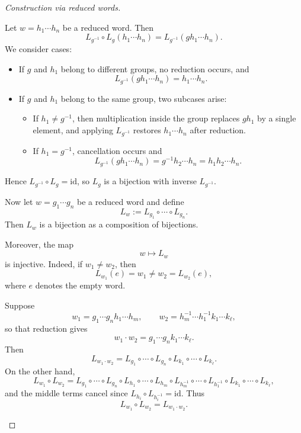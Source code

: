\documentclass[11pt,a4paper]{article}
\theoremstyle{definition}
\theoremstyle{plain}
\theoremstyle{remark}
\newcommand{\1}{\mathbbm{1}}
\begin{document}
\begin{proof}[Construction via reduced words]
\begin{itemize}
    Let $w = h_1 \cdots h_n$ be a reduced word. Then
    \[
    L_{g^{-1}} \circ L_g (h_1 \cdots h_n)
    = L_{g^{-1}}(g h_1 \cdots h_n).
    \]
    We consider cases:

    \begin{itemize}
    \item If $g$ and $h_1$ belong to different groups, no reduction occurs,
    and
    \[
    L_{g^{-1}}(g h_1 \cdots h_n)
    = h_1 \cdots h_n.
    \]

    \item If $g$ and $h_1$ belong to the same group, two subcases arise:
    \begin{itemize}
    \item If $h_1 \neq g^{-1}$, then multiplication inside the group replaces
    $g h_1$ by a single element, and applying $L_{g^{-1}}$ restores
    $h_1 \cdots h_n$ after reduction.

    \item If $h_1 = g^{-1}$, cancellation occurs and
    \[
    L_{g^{-1}}(g h_1 \cdots h_n)
    = g^{-1} h_2 \cdots h_n
    = h_1 h_2 \cdots h_n.
    \]
    \end{itemize}
    \end{itemize}

    Hence $L_{g^{-1}} \circ L_g = \mathrm{id}$, so $L_g$ is a bijection
    with inverse $L_{g^{-1}}$.

    Now let $w = g_1 \cdots g_n$ be a reduced word and define
    \[
    L_w := L_{g_1} \circ \cdots \circ L_{g_n}.
    \]
    Then $L_w$ is a bijection as a composition of bijections.

    Moreover, the map
    \[
    w \longmapsto L_w
    \]
    is injective. Indeed, if $w_1 \neq w_2$, then
    \[
    L_{w_1}(e) = w_1 \neq w_2 = L_{w_2}(e),
    \]
    where $e$ denotes the empty word.

    Suppose
    \[
    w_1 = g_1 \cdots g_n h_1 \cdots h_m,
    \qquad
    w_2 = h_m^{-1} \cdots h_1^{-1} k_1 \cdots k_\ell,
    \]
    so that reduction gives
    \[
    w_1 \cdot w_2 = g_1 \cdots g_n k_1 \cdots k_\ell.
    \]
    Then
    \[
    L_{w_1 \cdot w_2}
    = L_{g_1} \circ \cdots \circ L_{g_n}
    \circ L_{k_1} \circ \cdots \circ L_{k_\ell}.
    \]
    On the other hand,
    \[
    L_{w_1} \circ L_{w_2}
    = L_{g_1} \circ \cdots \circ L_{g_n}
    \circ L_{h_1} \circ \cdots \circ L_{h_m}
    \circ L_{h_m^{-1}} \circ \cdots \circ L_{h_1^{-1}}
    \circ L_{k_1} \circ \cdots \circ L_{k_\ell},
    \]
    and the middle terms cancel since
    $L_{h_i} \circ L_{h_i^{-1}} = \mathrm{id}$.
    Thus
    \[
    L_{w_1} \circ L_{w_2} = L_{w_1 \cdot w_2}.
    \]


\end{itemize}
\end{proof}
\end{document}
